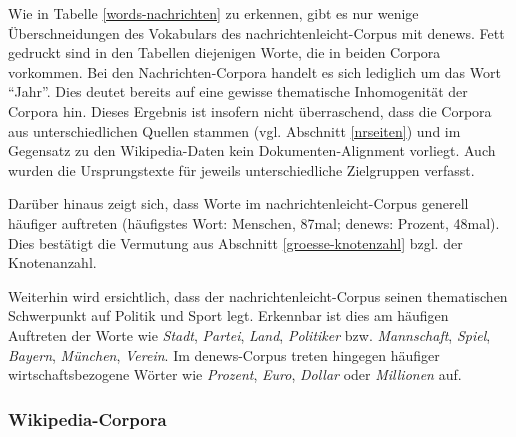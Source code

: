 \documentclass[11pt, a4paper]{article}
\begin{document}
Wie in Tabelle \ref{words-nachrichten} zu erkennen, gibt es nur wenige
Überschneidungen des Vokabulars des nachrichtenleicht-Corpus mit denews.
Fett gedruckt sind in den Tabellen diejenigen Worte, die in beiden Corpora
vorkommen.
Bei den Nachrichten-Corpora handelt es sich lediglich um das Wort "`Jahr"'.
Dies deutet bereits auf eine gewisse thematische Inhomogenität der Corpora hin.
Dieses Ergebnis ist insofern nicht überraschend, dass die Corpora aus
unterschiedlichen Quellen stammen (vgl. Abschnitt \ref{nrseiten}) und
im Gegensatz zu den Wikipedia-Daten kein Dokumenten-Alignment vorliegt.
Auch wurden die Ursprungstexte für jeweils unterschiedliche Zielgruppen verfasst.

Darüber hinaus zeigt sich, dass Worte im nachrichtenleicht-Corpus generell
häufiger auftreten (häufigstes Wort: Menschen, 87mal; denews: Prozent, 48mal).
Dies bestätigt die Vermutung aus Abschnitt \ref{groesse-knotenzahl} bzgl. der
Knotenanzahl.

Weiterhin wird ersichtlich, dass der nachrichtenleicht-Corpus seinen
thematischen Schwerpunkt auf Politik und Sport legt.
Erkennbar ist dies am häufigen Auftreten der Worte wie \emph{Stadt}, \emph{Partei}, \emph{Land},
\emph{Politiker} bzw. \emph{Mannschaft}, \emph{Spiel}, \emph{Bayern}, \emph{München}, \emph{Verein}.
Im denews-Corpus treten hingegen häufiger wirtschaftsbezogene Wörter wie \emph{Prozent},
\emph{Euro}, \emph{Dollar} oder \emph{Millionen} auf.


\subsubsection{Wikipedia-Corpora}
\end{document}
